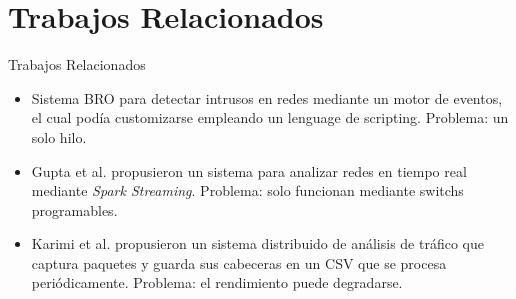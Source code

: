 \documentclass[aspectratio=149]{beamer}
\begin{document}
\section{Trabajos Relacionados}
\begin{frame}[label=relat]{Trabajos Relacionados}
    \begin{itemize}
        \item Sistema BRO para detectar intrusos en redes mediante un motor de eventos, el cual podía customizarse empleando un lenguage de scripting. Problema: un solo hilo.
        \item Gupta et al. propusieron un sistema para analizar redes en tiempo real mediante \textit{Spark Streaming}. Problema: solo funcionan mediante switchs programables.
        \item Karimi et al. propusieron un sistema distribuido de análisis de tráfico que captura paquetes y guarda sus cabeceras en un CSV que se procesa periódicamente. Problema: el rendimiento puede degradarse.
    \end{itemize}
\end{frame}

\end{document}
